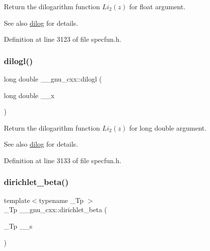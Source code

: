 Return the dilogarithm function $ Li_2(z) $ for {\ttfamily float} argument.

\begin{DoxySeeAlso}{See also}
\hyperlink{group__gnu__math__spec__func_ga4185ee1a0f9189a18085f65d52b6bc9b}{dilog} for details. 
\end{DoxySeeAlso}


Definition at line 3123 of file specfun.\+h.

\mbox{\label{group__gnu__math__spec__func_gae90c13ee690ebaf10a18a900fe2646f9}} 
\subsubsection{\texorpdfstring{dilogl()}{dilogl()}}
{\footnotesize\ttfamily long double \+\_\+\+\_\+gnu\+\_\+cxx\+::dilogl (\begin{DoxyParamCaption}\item[{long double}]{\+\_\+\+\_\+x }\end{DoxyParamCaption})\hspace{0.3cm}{\ttfamily [inline]}}

Return the dilogarithm function $ Li_2(z) $ for {\ttfamily long double} argument.

\begin{DoxySeeAlso}{See also}
\hyperlink{group__gnu__math__spec__func_ga4185ee1a0f9189a18085f65d52b6bc9b}{dilog} for details. 
\end{DoxySeeAlso}


Definition at line 3133 of file specfun.\+h.

\mbox{\label{group__gnu__math__spec__func_ga87466a2d429a2815d794acc21c882b08}} 
\subsubsection{\texorpdfstring{dirichlet\+\_\+beta()}{dirichlet\_beta()}}
{\footnotesize\ttfamily template$<$typename \+\_\+\+Tp $>$ \\
\+\_\+\+Tp \+\_\+\+\_\+gnu\+\_\+cxx\+::dirichlet\+\_\+beta (\begin{DoxyParamCaption}\item[{\+\_\+\+Tp}]{\+\_\+\+\_\+s }\end{DoxyParamCaption})\hspace{0.3cm}{\ttfamily [inline]}}

